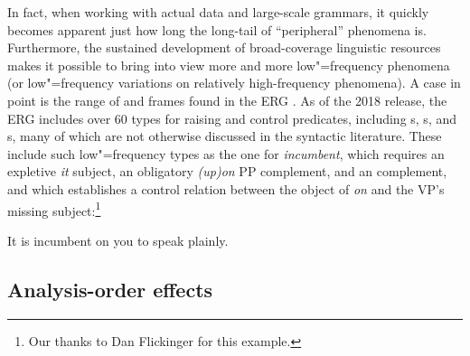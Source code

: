 \documentclass[output=paper,biblatex,babelshorthands,newtxmath,draftmode,colorlinks,citecolor=brown]{langscibook}
\begin{document}
\largerpage
\begin{sloppypar}
In fact, when working with actual data and large-scale grammars,
it quickly becomes apparent just how long the long-tail of ``peripheral'' phenomena is. Furthermore,
the sustained development of broad-coverage linguistic resources makes it possible to bring into
view more and more low"=frequency phenomena (or low"=frequency variations on relatively
high-frequency phenomena). A case in point is the range of  and 
 frames found in the ERG
\citep{Flickinger2000a,Flickinger2011a-u}. As of the 2018 release, the ERG includes over 60 types
for raising and control predicates, including s, s, and s,
many of which are not otherwise discussed in the syntactic literature. These include such
low"=frequency types as the one for \textit{incumbent}, which requires an expletive \textit{it}
subject, an obligatory \textit{(up)on} PP complement, and an  complement,
and which establishes a control relation between the object of \textit{on} and the VP's missing subject:\footnote{%
	Our thanks to Dan Flickinger for this example.
}
\end{sloppypar}

\begin{exe}
\ex\label{cl:incumbent} 
It is incumbent on you to speak plainly.
\end{exe}%
%

\subsection{Analysis-order effects}
\end{document}
